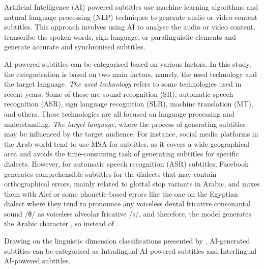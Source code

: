 \documentclass[english]{textolivre}
\newcommand{\ipa}[1]{{\ipafont #1}}
\begin{document}
Artificial Intelligence (AI) powered subtitles use machine learning
algorithms and natural language processing (NLP) techniques to generate
audio or video content subtitles. This approach involves using AI to
analyse the audio or video content, transcribe the spoken words, sign
language, or paralinguistic elements and generate accurate and
synchronised subtitles.

AI-powered subtitles can be categorised based on various factors. In
this study, the categorisation is based on two main factors, namely, the
used technology and the target language. \emph{The used technology}
refers to some technologies used in recent years. Some of these are
sound recognition (SR), automatic speech recognition (ASR), sign
language recognition (SLR), machine translation (MT), and others. These
technologies are all focused on language processing and understanding.
\emph{The target language,} where the process of generating subtitles
may be influenced by the target audience. For instance, social media
platforms in the Arab world tend to use MSA for subtitles, as it covers
a wide geographical area and avoids the time-consuming task of
generating subtitles for specific dialects. However, for automatic
speech recognition (ASR) subtitles, Facebook generates comprehensible
subtitles for the dialects that may contain orthographical errors,
mainly related to glottal stop variants in Arabic, and mixes them with
Alef or some phonetic-based errors like the one on the Egyptian dialect
where they tend to pronounce any voiceless dental fricative consonantal
sound \ipa{/θ/} as voiceless alveolar fricative \ipa{/s/}, and therefore, the model
generates the Arabic character , so  instead of
.

Drawing on the linguistic dimension classifications presented by
\cite{diaz-cintas__2007}, AI-generated subtitles can be
categorised as Intralingual AI-powered subtitles and Interlingual
AI-powered subtitles.
\end{document}
